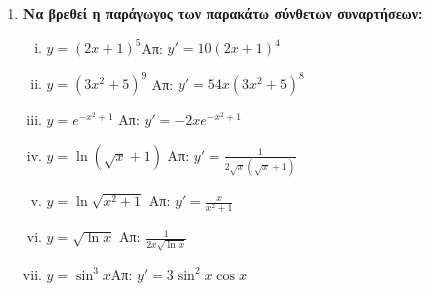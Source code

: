 \documentclass[a4paper,11pt]{article}
\begin{document}
\begin{enumerate}
\item {\bfseries Να βρεθεί η παράγωγος των παρακάτω σύνθετων συναρτήσεων:}

\begin{enumerate}[i)]
\item $y=(2x+1)^5$\hfill Απ: $y'=10(2x+1)^4$
\item $ y=(3x^{2}+5)^{9} $ \hfill Απ: $ y'=54x(3x^{2}+5)^{8} $ 
\item $ y=e^{-x^{2}+1} $ \hfill Απ: $ y'=-2x e^{-x^{2}+1} $ 
\item $ y= \ln{(\sqrt{ x } +1)} $ \hfill Απ: $ y'= \frac{1}{2 \sqrt{ x } (\sqrt{ x } +1)} $ 
\item $y= \ln{\sqrt{x^{2}+1}} $ \hfill Απ: $ y'= \frac{x}{x^{2}+1} $ 
\item $ y= \sqrt{ \ln{x} } $ \hfill Απ: $ \frac{1}{2x \sqrt{ \ln{x} }} $ 
\item $y=\sin^3 x$\hfill Απ: $y'=3\sin^2x \cos x$
\end{enumerate}


	


	
	
\end{enumerate}
\end{document}
